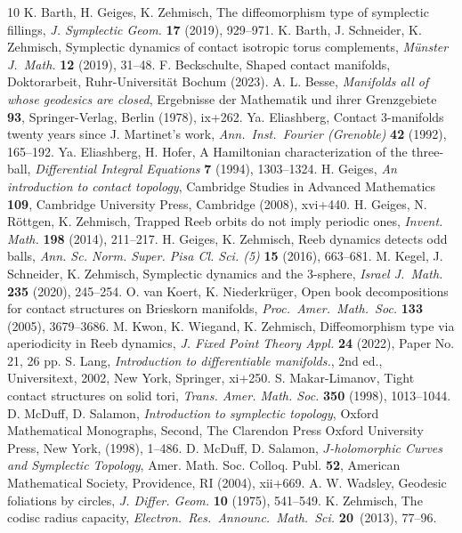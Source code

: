 \documentclass{amsart}
\theoremstyle{definition}
\begin{document}
\begin{thebibliography}{10}
  {\sc K. Barth, H. Geiges, K. Zehmisch},
  The diffeomorphism type of symplectic fillings,
  \textit{J. Symplectic Geom.} {\bf 17} (2019),
   929--971.
%
  {\sc K. Barth, J. Schneider, K. Zehmisch},
  Symplectic dynamics of contact isotropic torus complements,
  \textit{M\"unster J.\ Math.} {\bf 12} (2019),
  31--48.
%
  {\sc F. Beckschulte},
  Shaped contact manifolds,
  Doktorarbeit, Ruhr-Universität Bochum (2023). 
%
  {\sc A. L. Besse},
  \textit{Manifolds all of whose geodesics are closed},
  Ergebnisse der Mathematik und ihrer Grenzgebiete {\bf 93},
  Springer-Verlag, Berlin (1978), ix+262.
{\sc Ya. Eliashberg},
Contact 3-manifolds twenty years since J. Martinet’s work,
\textit{Ann.\ Inst.\ Fourier (Grenoble)} {\bf 42} (1992),
165--192.
%
  {\sc Ya. Eliashberg, H. Hofer},
  A Hamiltonian characterization of the three-ball,
  \textit{Differential Integral Equations} {\bf 7} (1994),
  1303--1324.
%
  {\sc H. Geiges},
  \textit{An introduction to contact topology},
  Cambridge Studies in Advanced Mathematics {\bf 109},
  Cambridge University Press, Cambridge (2008),
  xvi+440.
%
 {\sc H. Geiges, N. R\"ottgen, K. Zehmisch},
 Trapped {R}eeb orbits do not imply periodic ones,
 \textit{Invent. Math.} {\bf 198} (2014),
 211--217.
%
  {\sc H. Geiges, K. Zehmisch},
  Reeb dynamics detects odd balls,
  \textit{Ann. Sc. Norm. Super. Pisa Cl. Sci. (5)} {\bf 15} (2016),
  663--681.
%
  {\sc M. Kegel, J. Schneider, K. Zehmisch},
  Symplectic dynamics and the 3-sphere,
  \textit{Israel J.\ Math.} {\bf 235} (2020),
  245--254.
%
  {\sc O. van Koert, K. Niederkr\"uger},
  Open book decompositions for contact structures
  on Brieskorn manifolds,
  \textit{Proc.\ Amer.\ Math.\ Soc.} {\bf 133} (2005),
  3679--3686.
%
  {\sc M. Kwon, K. Wiegand, K. Zehmisch},
  Diffeomorphism type via aperiodicity in Reeb dynamics,
  \textit{J. Fixed Point Theory Appl.} {\bf 24} (2022),
  Paper No. 21, 26 pp.
%
  {\sc S. Lang},
  \emph{Introduction to differentiable manifolds.},
  2nd ed., Universitext, 2002, New York, Springer,
  xi+250.
%
  {\sc S. Makar-Limanov},
  Tight contact structures on solid tori,
  \textit{Trans. Amer. Math. Soc.} {\bf 350} (1998),
  1013--1044.
%
  {\sc D. McDuff, D. Salamon},
  \emph{Introduction to symplectic topology},
  Oxford Mathematical Monographs, Second,
  The Clarendon Press Oxford University Press, New York, (1998),
  1--486.
%
  {\sc D. McDuff, D. Salamon},
  \textit{$J$-holomorphic Curves and Symplectic Topology},
  Amer. Math. Soc. Colloq. Publ. {\bf 52},
  American Mathematical Society, Providence, RI (2004),
  xii+669.
%
  {\sc A. W. Wadsley},
  Geodesic foliations by circles,
  \textit{J. Differ. Geom.} {\bf 10} (1975),
  541--549.
%
  {\sc K. Zehmisch},
  The codisc radius capacity,
  \emph{Electron.\ Res.\ Announc.\ Math.\ Sci.}
  {\bf 20}\ (2013), 77--96.
%  
\end{thebibliography}
\end{document}
